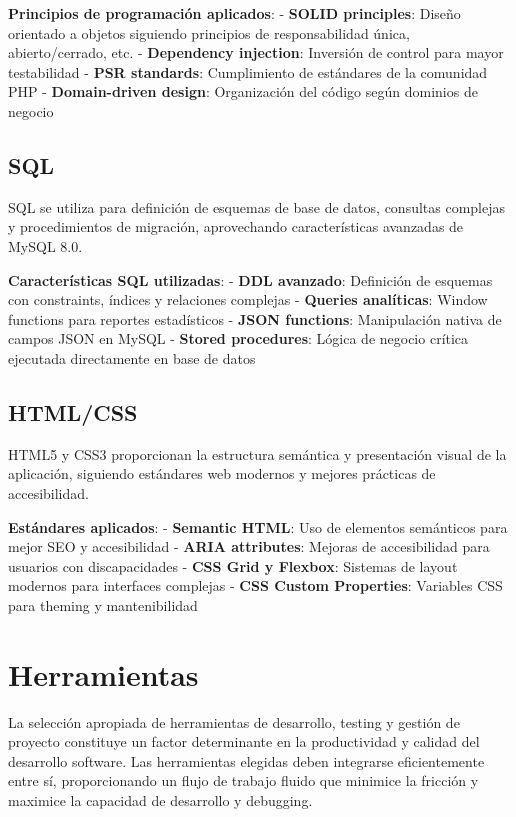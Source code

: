 \documentclass[12pt,a4paper,oneside]{report}
\begin{document}
\textbf{Principios de programación aplicados}: - \textbf{SOLID
principles}: Diseño orientado a objetos siguiendo principios de
responsabilidad única, abierto/cerrado, etc. - \textbf{Dependency
injection}: Inversión de control para mayor testabilidad - \textbf{PSR
standards}: Cumplimiento de estándares de la comunidad PHP -
\textbf{Domain-driven design}: Organización del código según dominios de
negocio

\subsection{SQL}\label{sql}

SQL se utiliza para definición de esquemas de base de datos, consultas
complejas y procedimientos de migración, aprovechando características
avanzadas de MySQL 8.0.

\textbf{Características SQL utilizadas}: - \textbf{DDL avanzado}:
Definición de esquemas con constraints, índices y relaciones complejas -
\textbf{Queries analíticas}: Window functions para reportes estadísticos
- \textbf{JSON functions}: Manipulación nativa de campos JSON en MySQL -
\textbf{Stored procedures}: Lógica de negocio crítica ejecutada
directamente en base de datos

\subsection{HTML/CSS}\label{htmlcss}

HTML5 y CSS3 proporcionan la estructura semántica y presentación visual
de la aplicación, siguiendo estándares web modernos y mejores prácticas
de accesibilidad.

\textbf{Estándares aplicados}: - \textbf{Semantic HTML}: Uso de
elementos semánticos para mejor SEO y accesibilidad - \textbf{ARIA
attributes}: Mejoras de accesibilidad para usuarios con discapacidades -
\textbf{CSS Grid y Flexbox}: Sistemas de layout modernos para interfaces
complejas - \textbf{CSS Custom Properties}: Variables CSS para theming y
mantenibilidad

\section{Herramientas}\label{herramientas}

La selección apropiada de herramientas de desarrollo, testing y gestión
de proyecto constituye un factor determinante en la productividad y
calidad del desarrollo software. Las herramientas elegidas deben
integrarse eficientemente entre sí, proporcionando un flujo de trabajo
fluido que minimice la fricción y maximice la capacidad de desarrollo y
debugging.
\end{document}
